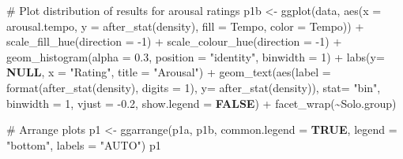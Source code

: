 \documentclass[
  bookmarksnumbered]{article}
\newenvironment{Shaded}{\begin{snugshade}}{\end{snugshade}}
\newcommand{\AttributeTok}[1]{\textcolor[rgb]{0.80,0.80,0.80}{#1}}
\newcommand{\CommentTok}[1]{\textcolor[rgb]{0.50,0.62,0.50}{#1}}
\newcommand{\ConstantTok}[1]{\textcolor[rgb]{0.86,0.64,0.64}{\textbf{#1}}}
\newcommand{\DecValTok}[1]{\textcolor[rgb]{0.86,0.86,0.80}{#1}}
\newcommand{\FloatTok}[1]{\textcolor[rgb]{0.75,0.75,0.82}{#1}}
\newcommand{\FunctionTok}[1]{\textcolor[rgb]{0.94,0.94,0.56}{#1}}
\newcommand{\NormalTok}[1]{\textcolor[rgb]{0.80,0.80,0.80}{#1}}
\newcommand{\OtherTok}[1]{\textcolor[rgb]{0.94,0.94,0.56}{#1}}
\newcommand{\SpecialCharTok}[1]{\textcolor[rgb]{0.86,0.64,0.64}{#1}}
\newcommand{\StringTok}[1]{\textcolor[rgb]{0.80,0.58,0.58}{#1}}
\begin{document}
\begin{Shaded}
\begin{Highlighting}[]
\CommentTok{\# Plot distribution of results for arousal ratings}
\NormalTok{p1b }\OtherTok{\textless{}{-}} \FunctionTok{ggplot}\NormalTok{(data, }\FunctionTok{aes}\NormalTok{(}\AttributeTok{x =}\NormalTok{ arousal.tempo, }\AttributeTok{y =} \FunctionTok{after\_stat}\NormalTok{(density),}
                       \AttributeTok{fill =}\NormalTok{ Tempo, }\AttributeTok{color =}\NormalTok{ Tempo)) }\SpecialCharTok{+}
  \FunctionTok{scale\_fill\_hue}\NormalTok{(}\AttributeTok{direction =} \SpecialCharTok{{-}}\DecValTok{1}\NormalTok{) }\SpecialCharTok{+} \FunctionTok{scale\_colour\_hue}\NormalTok{(}\AttributeTok{direction =} \SpecialCharTok{{-}}\DecValTok{1}\NormalTok{) }\SpecialCharTok{+}
  \FunctionTok{geom\_histogram}\NormalTok{(}\AttributeTok{alpha =} \FloatTok{0.3}\NormalTok{, }\AttributeTok{position =} \StringTok{"identity"}\NormalTok{, }\AttributeTok{binwidth =} \DecValTok{1}\NormalTok{) }\SpecialCharTok{+}
  \FunctionTok{labs}\NormalTok{(}\AttributeTok{y=} \ConstantTok{NULL}\NormalTok{, }\AttributeTok{x =} \StringTok{"Rating"}\NormalTok{, }\AttributeTok{title =} \StringTok{"Arousal"}\NormalTok{) }\SpecialCharTok{+}
  \FunctionTok{geom\_text}\NormalTok{(}\FunctionTok{aes}\NormalTok{(}\AttributeTok{label =} \FunctionTok{format}\NormalTok{(}\FunctionTok{after\_stat}\NormalTok{(density), }\AttributeTok{digits =} \DecValTok{1}\NormalTok{), }\AttributeTok{y=} \FunctionTok{after\_stat}\NormalTok{(density)), }
            \AttributeTok{stat=} \StringTok{"bin"}\NormalTok{, }\AttributeTok{binwidth =} \DecValTok{1}\NormalTok{, }
            \AttributeTok{vjust =} \SpecialCharTok{{-}}\FloatTok{0.2}\NormalTok{,}
            \AttributeTok{show.legend =} \ConstantTok{FALSE}\NormalTok{) }\SpecialCharTok{+}
  \FunctionTok{facet\_wrap}\NormalTok{(}\SpecialCharTok{\textasciitilde{}}\NormalTok{Solo.group)}

\CommentTok{\# Arrange plots}
\NormalTok{p1 }\OtherTok{\textless{}{-}} \FunctionTok{ggarrange}\NormalTok{(p1a, p1b,}
                \AttributeTok{common.legend =} \ConstantTok{TRUE}\NormalTok{,}
                \AttributeTok{legend =} \StringTok{"bottom"}\NormalTok{,}
                \AttributeTok{labels =} \StringTok{"AUTO"}\NormalTok{)}
\NormalTok{p1}
\end{Highlighting}
\end{Shaded}
\end{document}
